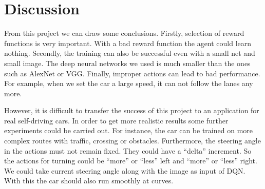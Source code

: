 
\section{Discussion}\label{sec:discussion}

From this project we can draw some conclusions. Firstly, selection of reward functions is very important. With a bad reward function the agent could learn nothing. Secondly, the training can also be successful even with a small net and small image. The deep neural networks we used is much smaller than the ones such as AlexNet or VGG. Finally, improper actions can lead to bad performance. For example, when we set the car a large speed, it can not follow the lanes any more.

However, it is difficult to transfer the success of this project to an application for real self-driving cars. In order to get more realistic results some further experiments could be carried out. For instance, the car can be trained on more complex routes with traffic, crossing or obstacles. Furthermore, the steering angle in the actions must not remain fixed. They could have a ``delta'' increment. So the actions for turning could be ``more'' or ``less'' left and ``more'' or ``less'' right. We could take current steering angle along with the image as input of DQN. With this the car should also run smoothly at curves. 